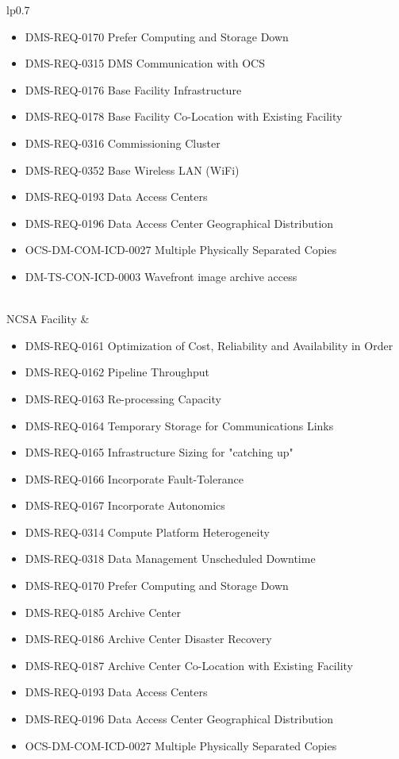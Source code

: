 \begin{xtabular}{lp{0.7\textwidth}}
\begin{itemize}
\item DMS-REQ-0170 Prefer Computing and Storage Down
\item DMS-REQ-0315 DMS Communication with OCS
\item DMS-REQ-0176 Base Facility Infrastructure
\item DMS-REQ-0178 Base Facility Co-Location with Existing Facility
\item DMS-REQ-0316 Commissioning Cluster
\item DMS-REQ-0352 Base Wireless LAN (WiFi)
\item DMS-REQ-0193 Data Access Centers
\item DMS-REQ-0196 Data Access Center Geographical Distribution
\item OCS-DM-COM-ICD-0027 Multiple Physically Separated Copies
\item DM-TS-CON-ICD-0003 Wavefront image archive access
\end{itemize} \\ \hline
NCSA Facility &
\begin{itemize}DMS-REQ-0008 Pipeline Availability
\item DMS-REQ-0161 Optimization of Cost, Reliability and Availability in Order
\item DMS-REQ-0162 Pipeline Throughput
\item DMS-REQ-0163 Re-processing Capacity
\item DMS-REQ-0164 Temporary Storage for Communications Links
\item DMS-REQ-0165 Infrastructure Sizing for "catching up"
\item DMS-REQ-0166 Incorporate Fault-Tolerance
\item DMS-REQ-0167 Incorporate Autonomics
\item DMS-REQ-0314 Compute Platform Heterogeneity
\item DMS-REQ-0318 Data Management Unscheduled Downtime
\item DMS-REQ-0170 Prefer Computing and Storage Down
\item DMS-REQ-0185 Archive Center
\item DMS-REQ-0186 Archive Center Disaster Recovery
\item DMS-REQ-0187 Archive Center Co-Location with Existing Facility
\item DMS-REQ-0193 Data Access Centers
\item DMS-REQ-0196 Data Access Center Geographical Distribution
\item OCS-DM-COM-ICD-0027 Multiple Physically Separated Copies

\end{itemize}
\end{xtabular}
